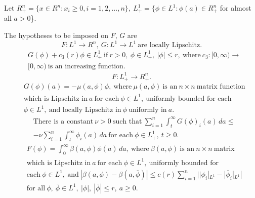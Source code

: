 \documentclass{surv-l}
\theoremstyle{plain}
\theoremstyle{definition}
\numberwithin{equation}{section}
\numberwithin{figure}{chapter}
\begin{document}
Let $R_{+}^{n}=\{x\in R^{n}: x_{i}\geq 0, i=1,2,\ldots, n\},\ L_{+}^{1}=\{\phi\in L^{1}: \phi(a)\in R_{+}^{n}$ for almost all $a>0$\}.

The hypotheses to be imposed on $F,\, G$ are
\begin{equation}\label{chap04:eq9.29}
F:L^{1}\rightarrow R^{n},\ G: L^{1}\rightarrow L^{1}\ \text{are locally Lipschitz}.
\end{equation}
\begin{equation}\label{chap04:eq9.30}
\begin{split}
&G(\phi)+c_{3}(r)\phi\in L_{+}^{1}\ \mathrm{if}\ r>0,\ \phi\in L_{+}^{1},\ |\phi|\leq r,\ \mathrm{where}\ c_{3}: [0, \infty)\rightarrow\\
&[0, \infty)\ \text{is an increasing function}.
\end{split}
\end{equation}
\begin{equation}\label{chap04:eq9.31}
F:L_{+}^{1}\rightarrow R_{+}^{n}.
\end{equation}
\begin{equation}\label{chap04:eq9.32}
\begin{split}
&G(\phi)(a)=-\mu(a, \phi)\phi,\ \text{where}\ \mu(a, \phi)\ \text{is an}\ n\times n\ \text{matrix function}\\
&\text{which is Lipschitz in}\ a\ \text{for each}\ \phi\in L^{1},\ \text{uniformly bounded for each}\\
&\phi\in L^{1},\ \text{and locally Lipschitz in}\ \phi\ \text{uniformly in}\ a.
\end{split}
\end{equation}
\begin{equation}\label{chap04:eq9.33}
\begin{split}
&\text{There is a constant}\ \nu >0\ \text{such that}\ \textstyle{\sum_{i=1}^{n}\int_{t}^{\infty}G(\phi)_{i}(a)\, da\leq}\\
&-\nu\textstyle{\sum_{i=1}^{n}\int_{t}^{\infty}\phi_{i}(a)\, da}\ \text{for each}\ \phi\in L_{+}^{1},\ t\geq 0.
\end{split}
\end{equation}
\begin{equation}\label{chap04:eq9.34}
\begin{split}
&F(\phi)=\textstyle{\int_{0}^{\infty}\beta(a, \phi)\phi(a)\, da},\ \text{where}\ \beta(a, \phi)\ \text{is an}\ n\times n\ \text{matrix}\\
&\text{which is Lipschitz in}\ a\ \text{for each}\ \phi\in L^{1},\ \text{uniformly bounded for}\\
&\text{each}\ \phi\in L^{1},\ \text{and}\ \textstyle{|\beta(a, \phi)-\beta(a, \overline{\phi})|\leq c(r)\sum_{i=1}^{n}||\phi_{i}|_{L^{1}}-|\overline{\phi}_{i}|_{L^{1}}|}\\
&\text{for all}\ \phi,\ \overline{\phi}\in L^{1},\ |\phi|,\ |\overline{\phi}|\leq r,\ a\geq 0.
\end{split}
\end{equation}
\end{document}
